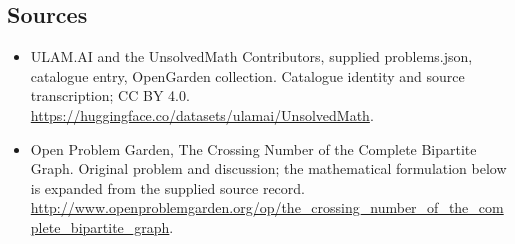\documentclass[11pt,a4paper]{article}
\begin{document}
\subsection{Sources}
\begin{itemize}
\item[S1] ULAM.AI and the UnsolvedMath Contributors, supplied problems.json, catalogue entry, OpenGarden collection. Catalogue identity and source transcription; CC BY 4.0.
\url{https://huggingface.co/datasets/ulamai/UnsolvedMath}.
\item[S2] Open Problem Garden, The Crossing Number of the Complete Bipartite Graph. Original problem and discussion; the mathematical formulation below is expanded from the supplied source record.
\url{http://www.openproblemgarden.org/op/the_crossing_number_of_the_complete_bipartite_graph}.
\end{itemize}
\end{document}
